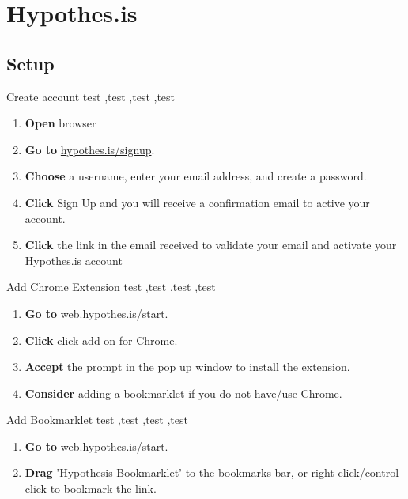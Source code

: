 \documentclass[10pt,a4paper]{article}
\begin{document}


\section{Hypothes.is}
\subsection{Setup}

\begin{textbox}{Create account}
test  \sep test \sep test \sep test

\bigskip

\begin{enumerate}
\item \textbf{Open} browser
\item \textbf{Go to} \href{hypothes.is/signup}{hypothes.is/signup}. 
\item \textbf{Choose} a username, enter your email address, and create a password.
\item \textbf{Click} Sign Up and you will receive a confirmation email to active your account.
\item \textbf{Click} the link in the email received to validate your email and activate your Hypothes.is account
\end{enumerate}

\end{textbox}

\begin{textbox}{Add Chrome Extension}
test  \sep test \sep test \sep test

\bigskip

\begin{enumerate}
\item \textbf{Go to} web.hypothes.is/start. 
\item \textbf{Click} click add-on for Chrome.
\item \textbf{Accept} the prompt in the pop up window to install the extension. 
\item \textbf{Consider} adding a bookmarklet if you do not have/use Chrome.
\end{enumerate}

\end{textbox}

\begin{textbox}{Add Bookmarklet}
test  \sep test \sep test \sep test

\bigskip

\begin{enumerate}
\item \textbf{Go to} web.hypothes.is/start. 
\item \textbf{Drag} 'Hypothesis Bookmarklet' to the bookmarks bar, or right-click/control-click to bookmark the link.
\end{enumerate}

\end{textbox}
\end{document}
